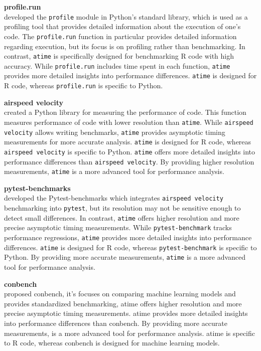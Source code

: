 \textbf{profile.run} \\
\citet{profile} developed the \texttt{profile} module in Python's standard library, which is used as a profiling tool that provides detailed information about the execution of one's code. The \texttt{profile.run} function in particular provides detailed information regarding execution, but its focus is on profiling rather than benchmarking. In contrast, \texttt{atime} is specifically designed for benchmarking R code with high accuracy. While \texttt{profile.run} includes time spent in each function, \texttt{atime} provides more detailed insights into performance differences. \texttt{atime} is designed for R code, whereas \texttt{profile.run} is specific to Python.
\vspace{0.1in}


\textbf{airspeed velocity} \\
\citet{airspeed_velocity} created a Python library for measuring the performance of code. This function measures performance of code with lower resolution than \texttt{atime}. While \texttt{airspeed velocity} allows writing benchmarks, \texttt{atime} provides asymptotic timing measurements for more accurate analysis. \texttt{atime} is designed for R code, whereas \texttt{airspeed velocity} is specific to Python. \texttt{atime} offers more detailed insights into performance differences than \texttt{airspeed velocity}. By providing higher resolution measurements, \texttt{atime} is a more advanced tool for performance analysis.
 
\vspace{0.1in}

\textbf{pytest-benchmarks} \\
\citet{pytest_benchmark} developed the Pytest-benchmarks which integrates \texttt{airspeed velocity} benchmarking into \texttt{pytest}, but its resolution may not be sensitive enough to detect small differences. In contrast, \texttt{atime} offers higher resolution and more precise asymptotic timing measurements. While \texttt{pytest-benchmark} tracks performance regressions, \texttt{atime} provides more detailed insights into performance differences. \texttt{atime} is designed for R code, whereas \texttt{pytest-benchmark} is specific to Python. By providing more accurate measurements, \texttt{atime} is a more advanced tool for performance analysis.
\vspace{0.1in}

\textbf{conbench} \\
\citet{conbench} proposed conbench, it's focuses on comparing machine learning models and provides standardized benchmarking, atime offers higher resolution and more precise asymptotic timing measurements. atime provides more detailed insights into performance differences than conbench. By providing more accurate measurements, is a more advanced tool for performance analysis. atime is specific to R code, whereas conbench is designed for machine learning models.
\vspace{0.1in}

